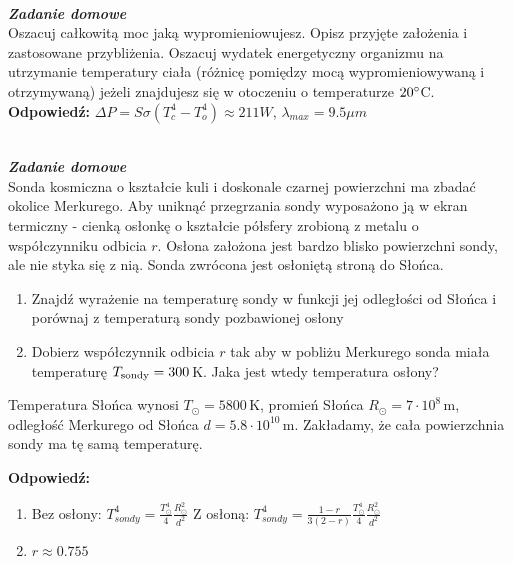 \documentclass[11pt,a4paper]{article}
\newcounter{zaddom}\newcommand{\zaddom}[1][]{\addtocounter{zaddom}{1} ~\\  {\bf \emph{Zadanie domowe \arabic{zaddom} #1 }} \\}
\begin{document}
\newpage

\zaddom
Oszacuj całkowitą moc jaką wypromieniowujesz. Opisz przyjęte założenia i zastosowane przybliżenia. Oszacuj
wydatek energetyczny organizmu na utrzymanie temperatury ciała (różnicę pomiędzy mocą wypromieniowywaną
i otrzymywaną) jeżeli znajdujesz się w otoczeniu o temperaturze $20\degree$C.
\vskip 10pt
\textbf{Odpowiedź:}
$\Delta P = S \sigma (T_c^4-T_o^4) \approx 211 W$, $\lambda_{max} = 9.5 \mu m$

\zaddom
Sonda kosmiczna o kształcie kuli i doskonale czarnej powierzchni ma zbadać okolice Merkurego. Aby uniknąć
przegrzania sondy wyposażono ją w ekran termiczny - cienką osłonkę o kształcie półsfery zrobioną z metalu
o współczynniku odbicia $r$. Osłona założona jest bardzo blisko powierzchni sondy, ale nie styka się z nią. Sonda
zwrócona jest osłoniętą stroną do Słońca.
\begin{enumerate}
\item Znajdź wyrażenie na temperaturę sondy w funkcji jej odległości od Słońca i porównaj z temperaturą sondy
pozbawionej osłony
\item Dobierz współczynnik odbicia $r$ tak aby w pobliżu Merkurego sonda miała temperaturę $T_{\rm sondy}= 300$\,K. 
Jaka jest wtedy temperatura osłony?
\end{enumerate}
Temperatura Słońca wynosi $T_\odot= 5800$\,K, promień Słońca $R_\odot = 7 \cdot 10^8$\,m, 
odległość Merkurego od Słońca $d = 5.8 \cdot 10^{10}$\,m. 
Zakładamy, że cała powierzchnia sondy ma tę samą temperaturę.

\vskip 10pt
\textbf{Odpowiedź:}
\begin{enumerate}
\item Bez osłony: $T_{sondy}^4 = \frac{T_\odot^4}{4} \frac{R_\odot^2}{d^2}$
Z osłoną: $T_{sondy}^4 = \frac{1-r}{3(2-r)} \frac{T_\odot^4}{4} \frac{R_\odot^2}{d^2}$
\item $r \approx 0.755$
\end{enumerate}
\end{document}

